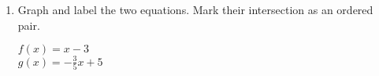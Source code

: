 \begin{enumerate}
\item Graph and label the two equations. Mark their intersection as an ordered pair.
  \begin{multicols}{2}
    $f(x) = x-3$ \\
    $g(x) = -\frac{3}{5}x+5$
  \end{multicols}
  \begin{center}
  \end{center}

\end{enumerate}
